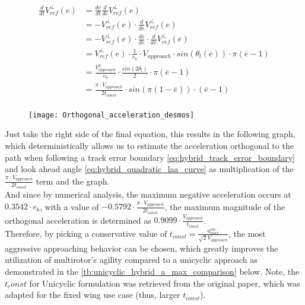 \begin{equation}
    \begin{split}
    \frac{d}{dt}V_{ref}^{\perp}(e) &= \frac{de}{dt}\frac{d}{de}V_{ref}^{\perp}(e)\\
    &= -V_{ref}^{\perp}(e) \cdot \frac{d}{de}V_{ref}^{\perp}(e)\\
    &= -V_{ref}^{\perp}(e) \cdot \frac{d\overline{e}}{de} \cdot \frac{d}{d\overline{e}}V_{ref}^{\perp}(\overline{e})\\
    &= V_{ref}^{\perp}(e) \cdot \frac{1}{e_b} \cdot V_{approach} \cdot sin(\theta_l(\overline{e})) \cdot \pi (\overline{e} - 1) \\
    &= \frac{V_{approach}^2}{e_b} \cdot \frac{sin(2\theta_l)}{2} \cdot \pi (\overline{e} - 1) \\
    &= \frac{\pi \cdot V_{approach}}{2t_{const}} \cdot sin(\pi (1-\overline{e})) \cdot (\overline{e} - 1)\\
    \end{split}
\label{eq:hybrid_orthogonal_acceleration_derive}
\end{equation}

\begin{figure}[h]
\centering
\texttt{[image: Orthogonal\_acceleration\_desmos]}
\label{eq:hybrid_orthogonal_acceleration_e_curve}
\end{figure}

Just take the right side of the final equation, this results in the following graph, which deterministically allows us to estimate the acceleration orthogonal to the path when following a track error boundary \autoref{eq:hybrid_track_error_boundary} and look ahead angle \autoref{eq:hybrid_quadratic_laa_curve} as multiplication of the $\frac{\pi \cdot V_{approach}}{2t_{const}}$ term and the graph.\\

And since by numerical analysis, the maximum negative acceleration occurs at $0.3542 \cdot e_b$, with a value of $-0.5792 \cdot \frac{\pi \cdot V_{approach}}{2t_{const}}$, the maximum magnitude of the orthogonal acceleration is determined as $0.9099 \cdot \frac{V_{approach}}{t_{const}}$.\\

Therefore, by picking a conservative value of $t_{const} = \frac{a_{max}^{mc}}{\sqrt{2} V_{approach}}$, the most aggressive approaching behavior can be chosen, which greatly improves the utilization of multirotor's agility compared to a unicyclic approach as demonstrated in the \autoref{tb:unicyclic_hybrid_a_max_comparison} below. Note, the $t_const$ for Unicyclic formulation was retrieved from the original paper\cite{stastny_flying_2019}, which was adapted for the fixed wing use case (thus, larger $t_{const}$).

